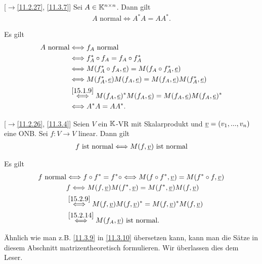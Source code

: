 \documentclass[../../main.tex]{subfiles}
\begin{document}
\begin{pro}\mbox{}[$\to$\ref{11.2.27}, \ref{11.3.7}]
\label{15.2.13}
Sei $A\in \mathbb K^{n\times n}$. Dann gilt
\begin{align*}
A\text{ normal}\Longleftrightarrow A^*A=AA^*.
\end{align*}
\end{pro}
\begin{cproof}
Es gilt
\begin{align*}
A\text{ normal}&\Longleftrightarrow f_A\text{ normal}\\
&\Longleftrightarrow f_A^*\circ f_A=f_A\circ f_A^*\\
&\Longleftrightarrow M(f_A^*\circ f_A,{\underline e})=M(f_A\circ f_A^*,{\underline e})\\
&\Longleftrightarrow M(f_A^*,{\underline e})M(f_A,{\underline e})=M(f_A,{\underline e})M(f_A^*,{\underline e})\\
&\stackrel{\ref{15.1.9}}{\Longleftrightarrow} M(f_A,{\underline e})^*M(f_A,{\underline e})=M(f_A,{\underline e})M(f_A,{\underline e})^*\\
&\Longleftrightarrow A^*A=AA^*.
\end{align*}
\end{cproof}

\begin{pro}\mbox{}[$\to$\ref{11.2.26}, \ref{11.3.4}]
\label{15.2.14}
Seien $V$ ein $\mathbb K$-VR mit Skalarprodukt und ${\underline v}=(v_1,...,v_n)$ eine ONB. Sei $f: V\to V$ linear. Dann gilt
\begin{align*}
f\text{ ist normal}\Longleftrightarrow M(f,{\underline v})\text{ ist normal}
\end{align*}
\end{pro}
\begin{cproof}
Es gilt
\begin{align*}
f\text{ normal}&\Longleftrightarrow f\circ f^*=f^*\circ \Longleftrightarrow M(f\circ f^*,{\underline v})=M(f^*\circ f,{\underline v})\\
&f\Longleftrightarrow M(f,{\underline v})M(f^*,{\underline v})=M(f^*,{\underline v})M(f,{\underline v})\\
&\stackrel{\ref{15.2.9}}{\Longleftrightarrow} M(f,{\underline v})M(f,{\underline v})^*=M(f,{\underline v})^*M(f,{\underline v})\\
&\stackrel{\ref{15.2.14}}{\Longleftrightarrow}M(f_A,{\underline v})\text{ ist normal}.
\end{align*}		 
\end{cproof}

\noindent Ähnlich wie man z.B. \ref{11.3.9} in \ref{11.3.10} übersetzen kann, kann man die Sätze in diesem Abschnitt matrizentheoretisch formulieren. Wir überlassen dies dem Leser.
\end{document}
